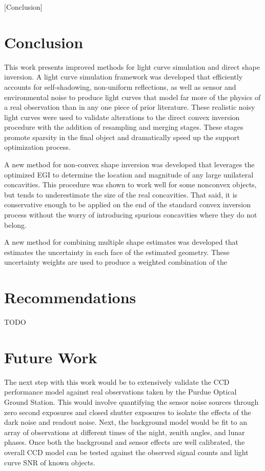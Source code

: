 [Conclusion]

\chapter{Conclusion}

This work presents improved methods for light curve simulation and direct shape inversion. A light curve simulation framework was developed that efficiently accounts for self-shadowing, non-uniform reflections, as well as sensor and environmental noise to produce light curves that model far more of the physics of a real observation than in any one piece of prior literature. These realistic noisy light curves were used to validate alterations to the direct convex inversion procedure with the addition of resampling and merging stages. These stages promote sparsity in the final object and dramatically speed up the support optimization process. 

A new method for non-convex shape inversion was developed that leverages the optimized EGI to determine the location and magnitude of any large unilateral concavities. This procedure was shown to work well for some nonconvex objects, but tends to underestimate the size of the real concavities. That said, it is conservative enough to be applied on the end of the standard convex inversion process without the worry of introducing spurious concavities where they do not belong.

A new method for combining multiple shape estimates was developed that estimates the uncertainty in each face of the estimated geometry. These uncertainty weights are used to produce a weighted combination of the 

\chapter{Recommendations}

TODO

\chapter{Future Work}

The next step with this work would be to extensively validate the CCD performance model against real observations taken by the Purdue Optical Ground Station. This would involve quantifying the sensor noise sources through zero second exposures and closed shutter exposures to isolate the effects of the dark noise and readout noise. Next, the background model would be fit to an array of observations at different times of the night, zenith angles, and lunar phases. Once both the background and sensor effects are well calibrated, the overall CCD model can be tested against the observed signal counts and light curve SNR of known objects.

